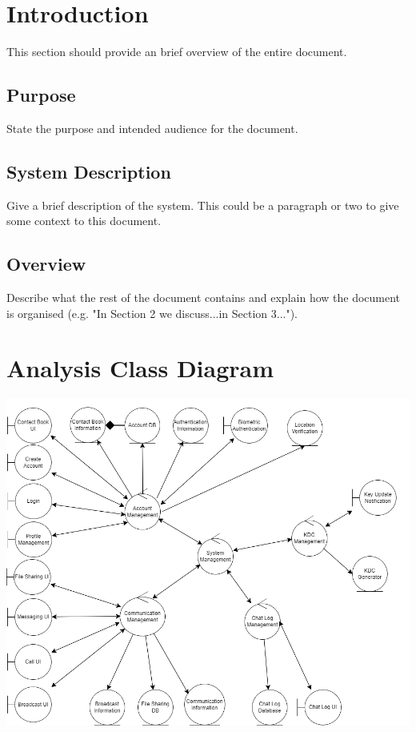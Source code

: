 \documentclass[]{article}
\begin{document}
\newpage
\section{Introduction}
\label{sec:introduction}

This section should provide an brief overview of the entire document.

\subsection{Purpose}
\label{sub:purpose}
State the purpose and intended audience for the document.

\subsection{System Description}
\label{sub:system_description}
Give a brief description of the system. This could be a paragraph or two to give some context to this document.


\subsection{Overview}
\label{sub:overview}
Describe what the rest of the document contains and explain how the document is organised (e.g. "In Section 2 we discuss...in Section 3...").



\section{Analysis Class Diagram}
\label{sec:analysis_class_diagram}
\includegraphics[width=\textwidth]{../images/ACD.png}
\end{document}

